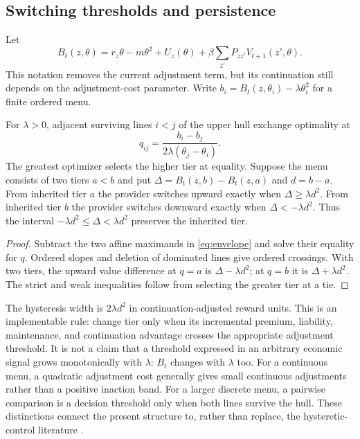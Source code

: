 \subsection{Switching thresholds and persistence}\label{sec:thresholds}
Let
\[
 B_t(z,\theta)=r_z\theta-m\theta^2+U_z(\theta)
       +\beta\sum_{z'}P_{zz'}V_{t+1}(z',\theta).
\]
This notation removes the current adjustment term, but its continuation still depends on the adjustment-cost parameter. Write $b_i=B_t(z,\theta_i)-\lambda\theta_i^2$ for a finite ordered menu.
\begin{proposition}\label{prop:hysteresis}
For $\lambda>0$, adjacent surviving lines $i<j$ of the upper hull exchange optimality at
\begin{equation}\label{eq:threshold}
 q_{ij}=\frac{b_i-b_j}{2\lambda(\theta_j-\theta_i)}.
\end{equation}
The greatest optimizer selects the higher tier at equality. Suppose the menu consists of two tiers $a<b$ and put $\Delta=B_t(z,b)-B_t(z,a)$ and $d=b-a$. From inherited tier $a$ the provider switches upward exactly when $\Delta\geq\lambda d^2$. From inherited tier $b$ the provider switches downward exactly when $\Delta<-\lambda d^2$. Thus the interval $-\lambda d^2\leq\Delta<\lambda d^2$ preserves the inherited tier.
\end{proposition}
\begin{proof}
Subtract the two affine maximands in \eqref{eq:envelope} and solve their equality for $q$. Ordered slopes and deletion of dominated lines give ordered crossings. With two tiers, the upward value difference at $q=a$ is $\Delta-\lambda d^2$; at $q=b$ it is $\Delta+\lambda d^2$. The strict and weak inequalities follow from selecting the greater tier at a tie.\end{proof}
The hysteresis width is $2\lambda d^2$ in continuation-adjusted reward units. This is an implementable rule: change tier only when its incremental premium, liability, maintenance, and continuation advantage crosses the appropriate adjustment threshold. It is not a claim that a threshold expressed in an arbitrary economic signal grows monotonically with $\lambda$: $B_t$ changes with $\lambda$ too. For a continuous menu, a quadratic adjustment cost generally gives small continuous adjustments rather than a positive inaction band. For a larger discrete menu, a pairwise comparison is a decision threshold only when both lines survive the hull. These distinctions connect the present structure to, rather than replace, the hysteretic-control literature \citep{HippHolzbaur1988}.

